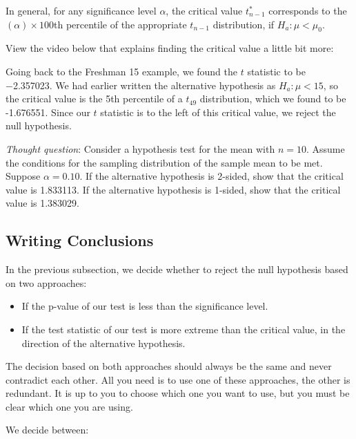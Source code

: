 \documentclass[
]{book}
\providecommand{\tightlist}{%
  \setlength{\itemsep}{0pt}\setlength{\parskip}{0pt}}
\begin{document}
In general, for any significance level \(\alpha\), the critical value \(t_{n-1}^*\) corresponds to the \((\alpha) \times 100\)th percentile of the appropriate \(t_{n-1}\) distribution, if \(H_a: \mu < \mu_0\).

View the video below that explains finding the critical value a little bit more:

Going back to the Freshman 15 example, we found the \(t\) statistic to be −2.357023. We had earlier written the alternative hypothesis as \(H_a: \mu < 15\), so the critical value is the 5th percentile of a \(t_{49}\) distribution, which we found to be -1.676551. Since our \(t\) statistic is to the left of this critical value, we reject the null hypothesis.

\emph{Thought question}: Consider a hypothesis test for the mean with \(n=10\). Assume the conditions for the sampling distribution of the sample mean to be met. Suppose \(\alpha=0.10\). If the alternative hypothesis is 2-sided, show that the critical value is 1.833113. If the alternative hypothesis is 1-sided, show that the critical value is 1.383029.

\subsection{Writing Conclusions}\label{writing-conclusions}

In the previous subsection, we decide whether to reject the null hypothesis based on two approaches:

\begin{itemize}
\tightlist
\item
  If the p-value of our test is less than the significance level.
\item
  If the test statistic of our test is more extreme than the critical value, in the direction of the alternative hypothesis.
\end{itemize}

The decision based on both approaches should always be the same and never contradict each other. All you need is to use one of these approaches, the other is redundant. It is up to you to choose which one you want to use, but you must be clear which one you are using.

We decide between:
\end{document}

